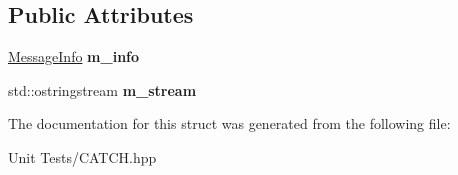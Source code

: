 \subsection*{Public Attributes}
\begin{DoxyCompactItemize}
\item 
\hyperlink{structCatch_1_1MessageInfo}{Message\+Info} {\bfseries m\+\_\+info}\hypertarget{structCatch_1_1MessageBuilder_a979f1c2b36d78f80ee275bfa5ba0209f}{}\label{structCatch_1_1MessageBuilder_a979f1c2b36d78f80ee275bfa5ba0209f}

\item 
std\+::ostringstream {\bfseries m\+\_\+stream}\hypertarget{structCatch_1_1MessageBuilder_a6488ab0cc4ea52affc9c0612c7c5df6b}{}\label{structCatch_1_1MessageBuilder_a6488ab0cc4ea52affc9c0612c7c5df6b}

\end{DoxyCompactItemize}


The documentation for this struct was generated from the following file\+:\begin{DoxyCompactItemize}
\item 
Unit Tests/C\+A\+T\+C\+H.\+hpp\end{DoxyCompactItemize}
